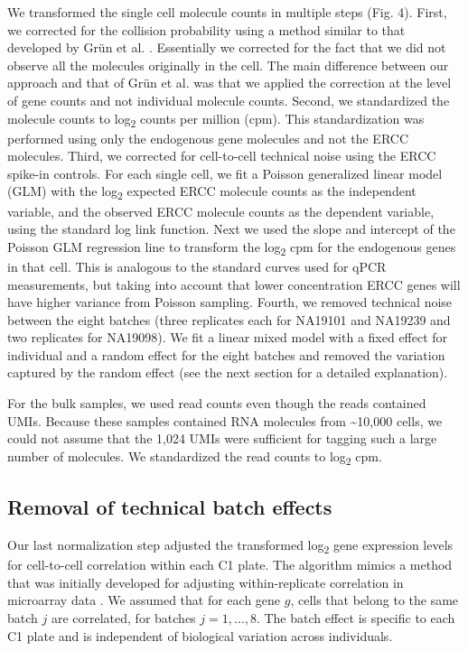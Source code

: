 We transformed the single cell molecule counts in multiple steps (Fig.
4). First, we corrected for the collision probability using a method
similar to that developed by Grün et al. \citep{Grun2014}. Essentially we
corrected for the fact that we did not observe all the molecules
originally in the cell. The main difference between our approach and
that of Grün et al. \citep{Grun2014} was that we applied the correction
at the level of gene counts and not individual molecule counts. Second,
we standardized the molecule counts to log\textsubscript{2} counts per
million (cpm). This standardization was performed using only the
endogenous gene molecules and not the ERCC molecules. Third, we
corrected for cell-to-cell technical noise using the ERCC spike-in
controls. For each single cell, we fit a Poisson generalized linear
model (GLM) with the log\textsubscript{2} expected ERCC molecule counts
as the independent variable, and the observed ERCC molecule counts as
the dependent variable, using the standard log link function. Next we
used the slope and intercept of the Poisson GLM regression line to
transform the log\textsubscript{2} cpm for the endogenous genes in that
cell. This is analogous to the standard curves used for qPCR
measurements, but taking into account that lower concentration ERCC
genes will have higher variance from Poisson sampling. Fourth, we
removed technical noise between the eight batches (three replicates each
for NA19101 and NA19239 and two replicates for NA19098). We fit a linear
mixed model with a fixed effect for individual and a random effect for
the eight batches and removed the variation captured by the random
effect (see the next section for a detailed explanation).

For the bulk samples, we used read counts even though the reads
contained UMIs. Because these samples contained RNA molecules from
\textasciitilde{}10,000 cells, we could not assume that the 1,024 UMIs
were sufficient for tagging such a large number of molecules. We
standardized the read counts to log\textsubscript{2} cpm.

\subsection{Removal of technical batch
effects}\label{removal-of-technical-batch-effects}

Our last normalization step adjusted the transformed
log\textsubscript{2} gene expression levels for cell-to-cell correlation
within each C1 plate. The algorithm mimics a method that was initially
developed for adjusting within-replicate correlation in microarray data
\citep{Smyth2005}. We assumed that for each gene $g$, cells that belong
to the same batch $j$ are correlated, for batches $j = 1, \dots, 8$. The
batch effect is specific to each C1 plate and is independent of
biological variation across individuals.

